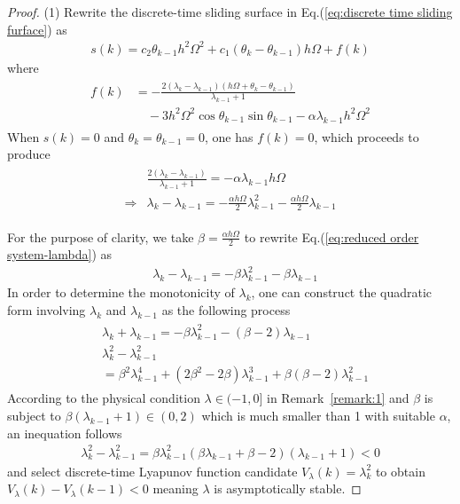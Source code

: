 \documentclass[10pt,onecolumn,draftcls]{IEEEtran}
\begin{document}
	\begin{proof}
  (1) Rewrite the discrete-time sliding surface in Eq.(\ref{eq:discrete time sliding furface}) as
	\begin{align}
		s(k) = c_2\theta_{k-1}h^2\Omega^2+c_1(\theta_k-\theta_{k-1})h\Omega+f(k)
	\end{align}
	where
	\begin{align}\begin{split}
		f(k) &=-\frac{2(\lambda_k-\lambda_{k-1})(h\Omega+\theta_k-\theta_{k-1})}{\lambda_{k-1}+1}\\
		&\quad-3h^2\Omega^2\cos\theta_{k-1}\sin\theta_{k-1}-\alpha\lambda_{k-1}h^2\Omega^2
	\end{split}\end{align}
	When $s(k)=0$ and $\theta_k=\theta_{k-1}=0$, one has $f(k)=0$, which proceeds to produce
	\begin{align}\begin{split}\label{eq:reduced order  system-lambda}
		&\frac{2(\lambda_k-\lambda_{k-1})}{\lambda_{k-1}+1}=-\alpha\lambda_{k-1}h\Omega\\
		\Rightarrow&\lambda_k-\lambda_{k-1} = -\frac{\alpha h\Omega}{2}\lambda_{k-1}^2-\frac{\alpha h\Omega}{2}\lambda_{k-1}
	\end{split}\end{align}
	
	For the purpose of clarity, we take $\beta = \frac{\alpha h\Omega}{2}$ to rewrite Eq.(\ref{eq:reduced order  system-lambda}) as
	\begin{align}\label{eq:lambda_k-lambda_k-1}
		&\lambda_k-\lambda_{k-1} = -\beta\lambda_{k-1}^2-\beta\lambda_{k-1}
	\end{align}
	In order to determine the monotonicity of $\lambda_k$, one can construct the quadratic form involving $\lambda_k$ and $\lambda_{k-1}$ as the following process
	\begin{align}\begin{split}
		&\lambda_k+\lambda_{k-1}  = -\beta\lambda_{k-1}^2-(\beta-2)\lambda_{k-1}\\
		&\lambda_k^2-\lambda_{k-1}^2\\
		& = \beta^2\lambda_{k-1}^4+(2\beta^2-2\beta)\lambda_{k-1}^3+\beta(\beta-2)\lambda_{k-1}^2
	\end{split}\end{align}
	According to the physical condition $\lambda\in(-1,0]$ in Remark~\ref{remark:1} and $\beta$ is subject to $\beta\left(\lambda_{k-1}+1\right)\in(0,2)$ which is much smaller than 1 with suitable $\alpha$, an inequation follows
	\begin{align}
		\lambda_k^2-\lambda_{k-1}^2 =\beta\lambda^2_{k-1}(\beta\lambda_{k-1}+\beta-2)(\lambda_{k-1}+1)<0
	\end{align} 
  and select discrete-time Lyapunov function candidate $V_\lambda(k)=\lambda_k^2$ to obtain $V_\lambda(k)-V_\lambda(k-1)<0$ meaning $\lambda$ is asymptotically stable. 


\end{proof}
\end{document}
